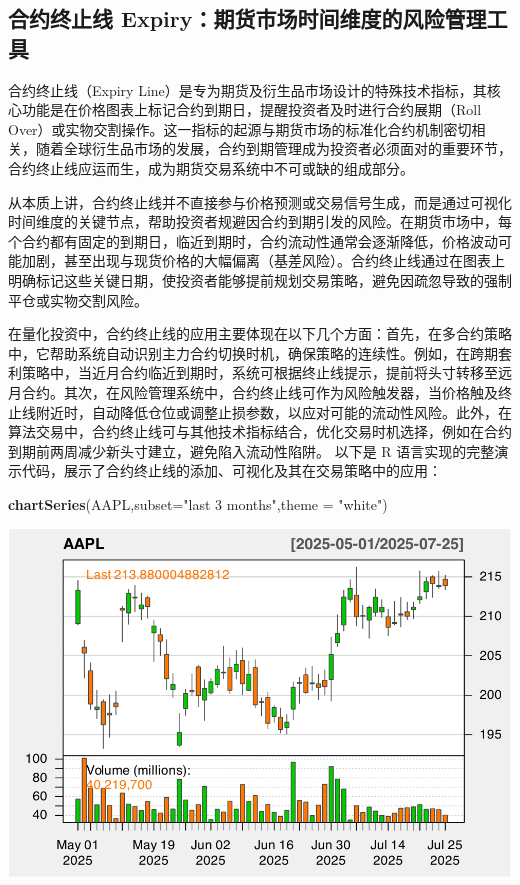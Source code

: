 \documentclass[]{ctexbook}
\newenvironment{Shaded}{\begin{snugshade}}{\end{snugshade}}
\newcommand{\AttributeTok}[1]{\textcolor[rgb]{0.13,0.29,0.53}{#1}}
\newcommand{\FunctionTok}[1]{\textcolor[rgb]{0.13,0.29,0.53}{\textbf{#1}}}
\newcommand{\NormalTok}[1]{#1}
\newcommand{\StringTok}[1]{\textcolor[rgb]{0.31,0.60,0.02}{#1}}
\begin{document}
\subsection{合约终止线 Expiry：期货市场时间维度的风险管理工具}\label{ux5408ux7ea6ux7ec8ux6b62ux7ebf-expiryux671fux8d27ux5e02ux573aux65f6ux95f4ux7ef4ux5ea6ux7684ux98ceux9669ux7ba1ux7406ux5de5ux5177}

合约终止线（Expiry Line）是专为期货及衍生品市场设计的特殊技术指标，其核心功能是在价格图表上标记合约到期日，提醒投资者及时进行合约展期（Roll Over）或实物交割操作。这一指标的起源与期货市场的标准化合约机制密切相关，随着全球衍生品市场的发展，合约到期管理成为投资者必须面对的重要环节，合约终止线应运而生，成为期货交易系统中不可或缺的组成部分。

从本质上讲，合约终止线并不直接参与价格预测或交易信号生成，而是通过可视化时间维度的关键节点，帮助投资者规避因合约到期引发的风险。在期货市场中，每个合约都有固定的到期日，临近到期时，合约流动性通常会逐渐降低，价格波动可能加剧，甚至出现与现货价格的大幅偏离（基差风险）。合约终止线通过在图表上明确标记这些关键日期，使投资者能够提前规划交易策略，避免因疏忽导致的强制平仓或实物交割风险。

在量化投资中，合约终止线的应用主要体现在以下几个方面：首先，在多合约策略中，它帮助系统自动识别主力合约切换时机，确保策略的连续性。例如，在跨期套利策略中，当近月合约临近到期时，系统可根据终止线提示，提前将头寸转移至远月合约。其次，在风险管理系统中，合约终止线可作为风险触发器，当价格触及终止线附近时，自动降低仓位或调整止损参数，以应对可能的流动性风险。此外，在算法交易中，合约终止线可与其他技术指标结合，优化交易时机选择，例如在合约到期前两周减少新头寸建立，避免陷入流动性陷阱。
以下是 R 语言实现的完整演示代码，展示了合约终止线的添加、可视化及其在交易策略中的应用：

\begin{Shaded}
\begin{Highlighting}[]
\FunctionTok{chartSeries}\NormalTok{(AAPL,}\AttributeTok{subset=}\StringTok{"last 3 months"}\NormalTok{,}\AttributeTok{theme =} \StringTok{"white"}\NormalTok{)}
\end{Highlighting}
\end{Shaded}

\includegraphics[width=0.9\linewidth]{QuantmodHandbook_files/figure-latex/expiry_ex-1}
\end{document}
